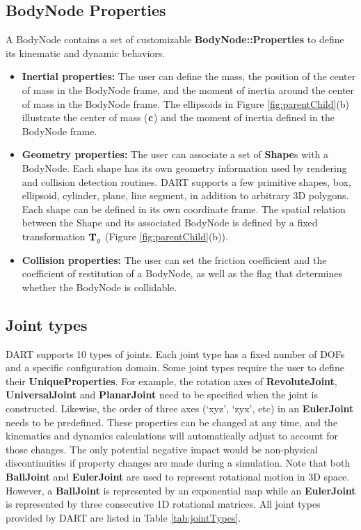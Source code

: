 \subsection{BodyNode Properties}
A BodyNode contains a set of customizable \textbf{BodyNode::Properties} to define its kinematic and dynamic behaviors.
\begin{itemize}[leftmargin=*] \itemsep1pt \parskip0pt 
  \item{\textbf{Inertial properties:}} The user can define the mass, the position of the center of mass in the BodyNode frame, and the moment of inertia around the center of mass in the BodyNode frame. The ellipsoids in Figure \ref{fig:parentChild}(b) illustrate the center of mass ($\mathbf{c}$) and the moment of inertia defined in the BodyNode frame.
  

  \item{\textbf{Geometry properties:}} The user can associate a set of \textbf{Shape}s with a BodyNode. Each shape has its own geometry information used by rendering and collision detection routines. DART supports a few primitive shapes, box, ellipsoid, cylinder, plane, line segment, in addition to arbitrary 3D polygons. Each shape can be defined in its own coordinate frame. The spatial relation between the Shape and its associated BodyNode is defined by a fixed transformation $\mathbf{T}_g$ (Figure \ref{fig:parentChild}(b)).
  \item{\textbf{Collision properties:}} The user can set the friction coefficient and the coefficient of restitution of a BodyNode, as well as the flag that determines whether the BodyNode is collidable.
\end{itemize}

\subsection{Joint types}
\label{sec:jointTypes}
DART supports 10 types of joints. Each joint type has a fixed number of DOFs and a specific configuration domain. Some joint types require the user to define their \textbf{UniqueProperties}. For example, the rotation axes of \textbf{RevoluteJoint}, \textbf{UniversalJoint} and \textbf{PlanarJoint} need to be specified when the joint is constructed. Likewise, the order of three axes (`xyz', `zyx', etc) in an \textbf{EulerJoint} needs to be predefined. These properties can be changed at any time, and the kinematics and dynamics calculations will automatically adjust to account for those changes. The only potential negative impact would be non-physical discontinuities if property changes are made during a simulation. Note that both \textbf{BallJoint} and \textbf{EulerJoint} are used to represent rotational motion in 3D space. However, a \textbf{BallJoint} is represented by an exponential map while an \textbf{EulerJoint} is represented by three consecutive 1D rotational matrices. All joint types provided by DART are listed in Table \ref{tab:jointTypes}.

